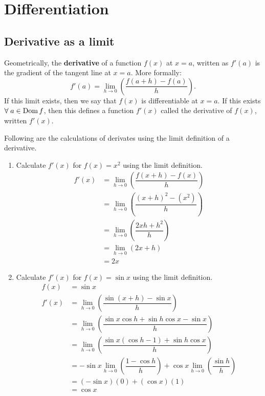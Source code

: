 \chapter{Differentiation}

\section{Derivative as a limit}

\begin{definition}
    Geometrically, the \textbf{derivative} of a function $f(x)$ at $x=a$, written as $f'(a)$ is the gradient of the tangent line at $x=a$. More formally: \[f'(a)=\lim_{h\to0}\left(\dfrac{f(a+h)-f(a)}{h}\right).\]
    If this limit exists, then we say that $f(x)$ is differentiable at $x=a$. If this exists $\forall\;a\in\operatorname{Dom}{f}$, then this defines a function $f'(x)$ called the derivative of $f(x)$, written $f'(x)$.
\end{definition}

\begin{example}
    Following are the calculations of derivates using the limit definition of a derivative.
    \begin{enumerate}
        \item Calculate $f'(x)$ for $f(x)=x^2$ using the limit definition.
        \begin{align*}
            f'(x)&=\lim_{h\to0}\left(\dfrac{f(x+h)-f(x)}{h}\right)\\
            &=\lim_{h\to0}\left(\dfrac{(x+h)^2-(x^2)}{h}\right)\\
            &=\lim_{h\to0}\left(\dfrac{2xh+h^2}{h}\right)\\
            &=\lim_{h\to0}(2x+h)\\
            &=2x
        \end{align*}
        
        \item Calculate $f'(x)$ for $f(x)=\sin{x}$ using the limit definition.
        \begin{align*}
            f(x)&=\sin{x}\\
            f'(x)&=\lim_{h\to0}\left(\dfrac{\sin{(x+h)}-\sin{x}}{h}\right)\\
            &=\lim_{h\to0}\left(\dfrac{\sin{x}\cos{h}+\sin{h}\cos{x}-\sin{x}}{h}\right)\\
            &=\lim_{h\to0}\left(\dfrac{\sin{x}(\cos{h}-1)+\sin{h}\cos{x}}{h}\right)\\
            &=-\sin{x}\lim_{h\to0}\left(\dfrac{1-\cos{h}}{h}\right)+\cos{x}\lim_{h\to0}\left(\dfrac{\sin{h}}{h}\right)\\
            &=(-\sin{x})(0)+(\cos{x})(1)\\
            &=\cos{x}
        \end{align*}
    \end{enumerate}
\end{example}

